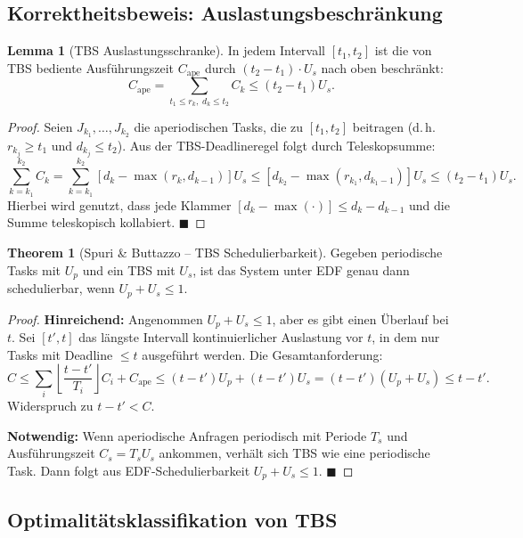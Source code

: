 ﻿\documentclass[a4paper,12pt]{report}
\theoremstyle{definition}
\newtheorem{lemma}{Lemma}[chapter]
\newtheorem{theorem}{Theorem}[chapter]
\begin{document}
\subsection{Korrektheitsbeweis: Auslastungsbeschränkung}

\begin{lemma}[TBS Auslastungsschranke]
	\label{lem:tbs_util}
	In jedem Intervall $[t_1, t_2]$ ist die von TBS bediente Ausführungszeit
	$C_{\mathrm{ape}}$ durch $(t_2 - t_1) \cdot U_s$ nach oben beschränkt:
	\[
		C_{\mathrm{ape}} = \sum_{t_1 \leq r_k,\; d_k \leq t_2} C_k \leq (t_2 - t_1) U_s.
	\]
\end{lemma}

\begin{proof}
	Seien $J_{k_1}, \ldots, J_{k_2}$ die aperiodischen Tasks, die zu $[t_1, t_2]$
	beitragen (d.\,h.\ $r_{k_j} \geq t_1$ und $d_{k_j} \leq t_2$). Aus der
	TBS-Deadlineregel folgt durch Teleskopsumme:
	\[
		\sum_{k=k_1}^{k_2} C_k = \sum_{k=k_1}^{k_2} [d_k - \max(r_k, d_{k-1})] U_s
		\leq [d_{k_2} - \max(r_{k_1}, d_{k_1-1})] U_s \leq (t_2 - t_1) U_s.
	\]
	Hierbei wird genutzt, dass jede Klammer $[d_k - \max(\cdot)] \leq d_k - d_{k-1}$
	und die Summe teleskopisch kollabiert. \hfill$\blacksquare$
\end{proof}

\begin{theorem}[Spuri \& Buttazzo -- TBS Schedulierbarkeit]
	\label{thm:tbs}
	Gegeben periodische Tasks mit $U_p$ und ein TBS mit $U_s$, ist das System
	unter EDF genau dann schedulierbar, wenn $U_p + U_s \leq 1$.
\end{theorem}

\begin{proof}
	\textbf{Hinreichend:} Angenommen $U_p + U_s \leq 1$, aber es gibt einen
	Überlauf bei $t$. Sei $[t', t]$ das längste Intervall kontinuierlicher Auslastung
	vor $t$, in dem nur Tasks mit Deadline $\leq t$ ausgeführt werden. Die Gesamtanforderung:
	\[
		C \leq \sum_i \left\lfloor \frac{t-t'}{T_i} \right\rfloor C_i + C_{\mathrm{ape}}
		\leq (t-t') U_p + (t-t') U_s = (t-t')(U_p + U_s) \leq t-t'.
	\]
	Widerspruch zu $t-t' < C$.

	\textbf{Notwendig:} Wenn aperiodische Anfragen periodisch mit Periode $T_s$
	und Ausführungszeit $C_s = T_s U_s$ ankommen, verhält sich TBS wie eine
	periodische Task. Dann folgt aus EDF-Schedulierbarkeit $U_p + U_s \leq 1$. \hfill$\blacksquare$
\end{proof}

\subsection{Optimalitätsklassifikation von TBS}
\end{document}
